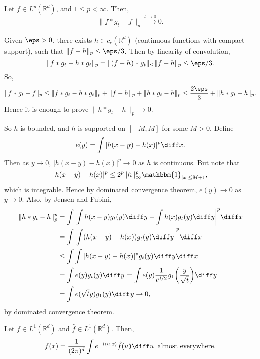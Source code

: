 \documentclass[12pt]{article}
\begin{document}
\begin{lemma}
	Let $f \in L^p(\mathbb{R}^{d})$, and $1 \leq p < \infty$. Then,
	\[
		\|f \ast g_t - f\|_p \overset{t \to 0}{\to } 0.
	\]
\end{lemma}

\begin{proofbox}
	Given $\eps > 0$, there exists $h \in c_c(\mathbb{R}^{d})$ (continuous functions with compact support), such that $\|f - h\|_p \leq \eps/3$. Then by linearity of convolution,
	\[
	\|f \ast g_t - h \ast g_t\|_p = \|(f - h)\ast g_t\|_ \leq \|f - h\|_p \leq \eps/3.
	\]
	So,
	\[
	\|f \ast g_t - f\|_p \leq \|f \ast g_t - h \ast g_t\|_p + \|f - h\|_p + \|h \ast g_t - h\|_p \leq \frac{2 \eps}{3} + \|h \ast g_t - h\|_p.
	\]
	Hence it is enough to prove $\|h \ast g_t - h\|_p \to 0$.

	So $h$ is bounded, and $h$ is supported on $[-M, M]$ for some $M > 0$. Define
	\[
	e(y) = \int |h(x - y) - h(x)|^p\diff x.
	\]
	Then as $y \to 0$, $|h(x - y) - h(x)|^p \to 0$ as $h$ is continuous. But note that
	\[
	|h(x - y) - h(x)|^p \leq 2^p \|h\|_\infty^p \mathbbm{1}_{|x|\leq M + 1},
	\]
	which is integrable. Hence by dominated convergence theorem, $e(y) \to 0$ as $y \to 0$. Also, by Jensen and Fubini,
	\begin{align*}
		\|h \ast g_t - h\|_p^p &= \int \biggl| \int h(x - y)g_t(y) \diff y - \int h(x) g_t(y) \diff y \biggr|^p \diff x \\
				       &= \int \biggl| \int (h(x - y) - h(x)) g_t(y) \diff y \biggr|^p \diff x \\
				       &\leq \int \int |h(x - y) - h(x)|^p g_t(y) \diff y \diff x \\
				       &= \int e(y) g_t(y) \diff y = \int e(y) \frac{1}{t^{d/2}} g_1\biggl( \frac{y}{\sqrt t} \biggr) \diff y \\
				       &= \int e(\sqrt t y) g_1(y) \diff y \to 0,
	\end{align*}
	by dominated convergence theorem.
\end{proofbox}

\begin{theorem}
	Let $f \in L^1(\mathbb{R}^d)$ and $\hat f \in L^1(\mathbb{R}^d)$. Then,
	\[
		f(x) = \frac{1}{(2 \pi)^d} \int e^{-i \langle u , x\rangle} \hat f(u) \diff u \;\;\text{\normalfont almost everywhere}.
	\]
\end{theorem}
\end{document}
